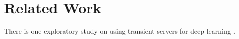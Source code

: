 \section{Related Work}

There is one exploratory study on using transient servers for deep learning
\cite{corr/abs-1903-00045}.
